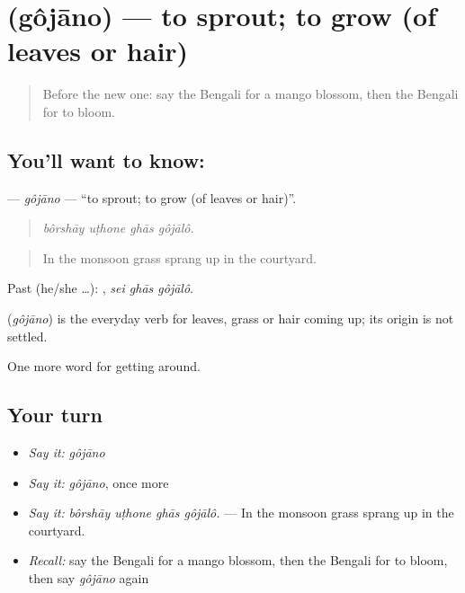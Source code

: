 \section[\texorpdfstring{\bn{গজানো} (gôjāno)}{গজানো (gôjāno)}]{ (gôjāno) — to sprout; to grow (of leaves or hair)}

\label{lesson:BN-C436-gojano}



\begin{quote}
Before the new one: say the Bengali for a mango blossom, then the Bengali for to bloom.
\end{quote}

\subsection*{You'll want to know: }
\textbf{} — \emph{gôjāno} — \textquotedblleft{}to sprout; to grow (of leaves or hair)\textquotedblright{}.

\begin{quote}
   
\end{quote}

\begin{quote}
\emph{bôrshāy uṭhone ghās gôjālô.}
\end{quote}

\begin{quote}
In the monsoon grass sprang up in the courtyard.
\end{quote}

Past (he/she …):   , \emph{sei ghās gôjālô}.

\begin{cousinweb}
\textbf{} (\emph{gôjāno}) is the everyday verb for leaves, grass or hair coming up; its origin is not settled.
\end{cousinweb}

\begin{grammarlens}[title={What you've built}]
One more word for getting around.
\end{grammarlens}

\subsection*{Your turn}
\begin{itemize}
\raggedright
  \item \emph{Say it:} \emph{gôjāno}
  \item \emph{Say it:} \emph{gôjāno}, once more
  \item \emph{Say it:} \emph{bôrshāy uṭhone ghās gôjālô.} — In the monsoon grass sprang up in the courtyard.
  \item \emph{Recall:} say the Bengali for a mango blossom, then the Bengali for to bloom, then say \emph{gôjāno} again
\end{itemize}

